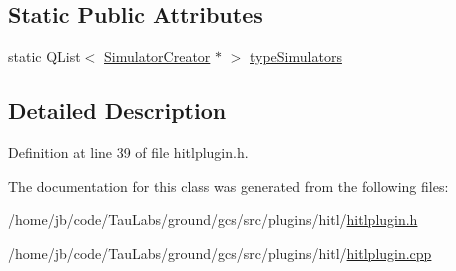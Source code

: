 \subsection*{\-Static \-Public \-Attributes}
\begin{DoxyCompactItemize}
\item 
static \-Q\-List$<$ \hyperlink{class_simulator_creator}{\-Simulator\-Creator} $\ast$ $>$ \hyperlink{group___h_i_t_l_plugin_ga0400c2f74f4a0c3cd840f95c99b1b601}{type\-Simulators}
\end{DoxyCompactItemize}


\subsection{\-Detailed \-Description}


\-Definition at line 39 of file hitlplugin.\-h.



\-The documentation for this class was generated from the following files\-:\begin{DoxyCompactItemize}
\item 
/home/jb/code/\-Tau\-Labs/ground/gcs/src/plugins/hitl/\hyperlink{hitlplugin_8h}{hitlplugin.\-h}\item 
/home/jb/code/\-Tau\-Labs/ground/gcs/src/plugins/hitl/\hyperlink{hitlplugin_8cpp}{hitlplugin.\-cpp}\end{DoxyCompactItemize}
